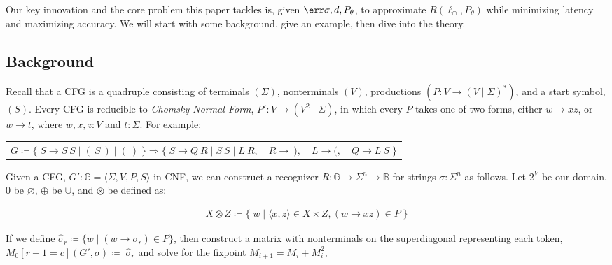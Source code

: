 \documentclass[runningheads]{llncs}
\begin{document}
Our key innovation and the core problem this paper tackles is, given $\err\sigma, d, P_\theta$, to approximate $R(\ell_\cap, P_\theta)$ while minimizing latency and maximizing accuracy. We will start with some background, give an example, then dive into the theory.

\subsection{Background}\label{sec:background}

Recall that a CFG is a quadruple consisting of terminals $(\Sigma)$, nonterminals $(V)$, productions $(P\colon V \rightarrow (V \mid \Sigma)^*)$, and a start symbol, $(S)$. Every CFG is reducible to \textit{Chomsky Normal Form}, $P'\colon V \rightarrow (V^2 \mid \Sigma)$, in which every $P$ takes one of two forms, either $w \rightarrow xz$, or $w \rightarrow t$, where $w, x, z: V$ and $t: \Sigma$. For example:\vspace{-3pt}

\begin{table}[H]
\begin{tabular}{llll}
$G\coloneqq\big\{\;S \rightarrow S\:S \mid (\:S\:) \mid (\:)\;\big\} \Longrightarrow \big\{\;S\rightarrow Q\:R \mid S\:S \mid L\:R,$ & $R \rightarrow\:),$ & $L \rightarrow (,$ & $Q\rightarrow L\:S\;\big\}$
\end{tabular}
\end{table}\vspace{-8pt}

\noindent Given a CFG, $G' : \mathbb{G} = \langle \Sigma, V, P, S\rangle$ in CNF, we can construct a recognizer $R: \mathbb{G} \rightarrow \Sigma^n \rightarrow \mathbb{B}$ for strings $\sigma: \Sigma^n$ as follows. Let $2^V$ be our domain, $0$ be $\varnothing$, $\oplus$ be $\cup$, and $\otimes$ be defined as:\vspace{-10pt}

\begin{align}
X \otimes Z \coloneqq \big\{\;w \mid \langle x, z\rangle \in X \times Z, (w\rightarrow xz) \in P\;\big\}
\end{align}

\noindent If we define $\hat\sigma_r \coloneqq \{w \mid (w \rightarrow \sigma_r) \in P\}$, then construct a matrix with nonterminals on the superdiagonal representing each token, $M_0[r+1=c](G', \sigma) \coloneqq \;\hat\sigma_r$ and solve for the fixpoint $M_{i+1} = M_i + M_i^2$,\vspace{-10pt}
\end{document}
